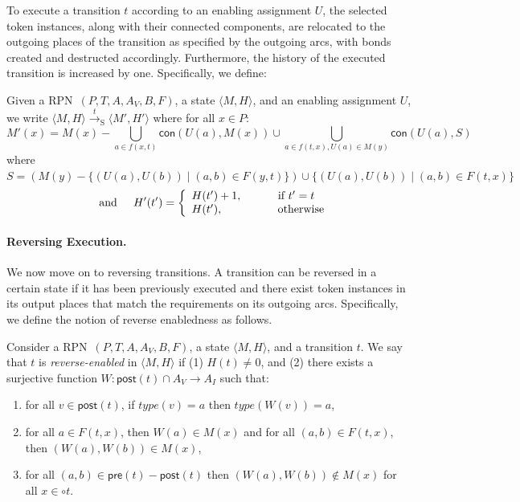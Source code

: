 \documentclass[runningheads]{llncs}
\newcommand{\trans}[1]{\stackrel{#1}{\rightarrow}_{\mathrm{S}}}
\newcommand{\guard}[1]{\mathsf{pre}(#1)}
\newcommand{\effects}[1]{\mathsf{post}(#1)}
\newcommand{\connected}{\mathsf{con}}
\newcommand{\state}[2]{\langle {#1}, {#2}\rangle}
\newcommand{\RPN}{\textsc{RPN\ }}
\newcommand{\type}{\mathit{type}}
\begin{document}
To execute a transition $t$ according to an enabling assignment $U$, 
the selected token instances, along with their connected components,
are relocated to the outgoing places of the transition as specified
by the outgoing arcs, with bonds created and destructed accordingly. 
Furthermore,
the history of the executed transition is increased by one. Specifically,
we define:
\begin{definition}{\rm \label{forward}
		Given a \RPN $(P,T,  A, A_V, B, F)$, a state $\langle M, H\rangle$, and an
		enabling assignment $U$, we write $\state{M}{H}
		\trans{t} \state{M'}{H'}$
		where for all $x\in P$:
		\[
		M'(x) =   M(x)- \bigcup_{a\in f(x,t)} \connected(U(a), M(x)) 
		\cup  \bigcup_{a\in f(t,x),U(a)\in M(y)} \connected(U(a),S)\]
		where $S= (M(y)
		-\{(U(a),U(b))\mid (a,b)\in F(y,t)\})\cup \{ (U(a),U(b))\mid (a,b)\in F(t,x) \}$
		\[
		\hspace{0.2in}\mbox{and}\hspace{0.2in}
		H'(t') = \left\{
		\begin{array}{ll}
		H(t')+1, \hspace{1cm} \textrm{ if } t' = t  \; \\
		H(t'), \hspace{1.5cm}  \;\textrm{ otherwise }
		\end{array}
		\right.			\]	
}\end{definition} 


\paragraph{Reversing Execution.}
We now move on to  reversing transitions. 
A transition can be reversed in a certain state if it has been previously executed and there exist token instances in its output places 
that match the requirements on its outgoing arcs. Specifically, we define the notion of reverse enabledness
as follows.
\begin{definition}\label{renabled}{\rm
		Consider a \RPN $(P,T, A, A_V, B, F)$, a state $\state{M}{H}$, and a transition $t$.
		We say that $t$ is \emph{reverse-enabled} in $\state{M}{H}$ if (1)  $H(t)\neq 0$, and (2)
		there exists a surjective function 
		$W:\effects{t}\cap A_V\rightarrow  A_I$ such that:
		\begin{enumerate}
			\item  for all
			$v\in\effects{t}$, if $\type(v) = a$
			then $\type(W(v))=a$, 
			\item for all $a\in F(t,x)$, then $W(a)\in M(x)$ and for all $(a,b)\in F(t,x)$, then $(W(a),W(b))\in M(x)$, 
			\item  for all $(a,b)\in \guard{t} - \effects{t}$ then $(W(a),W(b))\not\in M(x)$ for all $x\in\circ t$.
		\end{enumerate}
}\end{definition}
\end{document}
